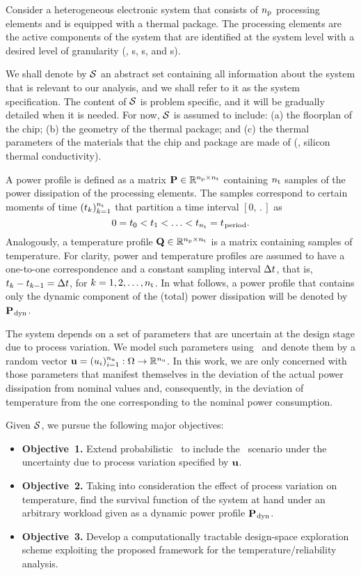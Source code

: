 Consider a heterogeneous electronic system that consists of ${n_\text{p}}$ processing elements and is equipped with a thermal package.
The processing elements are the active components of the system that are identified at the system level with a desired level of granularity (\eg, s, s, and s).

We shall denote by $\mathcal{S}$ an abstract set containing all information about the system that is relevant to our analysis, and we shall refer to it as the system specification.
The content of $\mathcal{S}$ is problem specific, and it will be gradually detailed when it is needed.
For now, $\mathcal{S}$ is assumed to include: (a) the floorplan of the chip; (b) the geometry of the thermal package; and (c) the thermal parameters of the materials that the chip and package are made of (\eg, silicon thermal conductivity).

A power profile is defined as a matrix $\mathbf{P} \in \mathbb{R}^{{n_\text{p}} \times {n_\text{t}}}$ containing ${n_\text{t}}$ samples of the power dissipation of the processing elements.
The samples correspond to certain moments of time $(t_k)_{k = 1}^{n_\text{t}}$ that partition a time interval $[0, \period]$ as
\[
  0 = t_0 < t_1 < \dotsc < t_{n_\text{t}} = t_{\text{\kern0.1emperiod}}.
\]
Analogously, a temperature profile $\mathbf{Q} \in \mathbb{R}^{{n_\text{p}} \times {n_\text{t}}}$ is a matrix containing samples of temperature.
For clarity, power and temperature profiles are assumed to have a one-to-one correspondence and a constant sampling interval $\Delta t$, that is, $t_k - t_{k - 1} = \Delta t$, for $k = 1, 2, \dots, {n_\text{t}}$.
In what follows, a power profile that contains only the dynamic component of the (total) power dissipation will be denoted by $\mathbf{P}_{\text{\kern0.1emdyn}}$.

The system depends on a set of parameters that are uncertain at the design stage due to process variation.
We model such parameters using \rvs\ and denote them by a random vector $\mathbf{u} = (u_i)_{i = 1}^{n_\text{u}}: \Omega \to \mathbb{R}^{n_\text{u}}$.
In this work, we are only concerned with those parameters that manifest themselves in the deviation of the actual power dissipation from nominal values and, consequently, in the deviation of temperature from the one corresponding to the nominal power consumption.

Given $\mathcal{S}$, we pursue the following major objectives:
\begin{itemize}
  \item {\bfseries Objective~1.} Extend probabilistic \ta\ to include the \DSS\ scenario under the uncertainty due to process variation specified by $\mathbf{u}$.
  \item {\bfseries Objective~2.} Taking into consideration the effect of process variation on temperature, find the survival function of the system at hand under an arbitrary workload given as a dynamic power profile $\mathbf{P}_{\text{\kern0.1emdyn}}$.
  \item {\bfseries Objective~3.} Develop a computationally tractable design-space exploration scheme exploiting the proposed framework for the temperature/reliability analysis.
\end{itemize}

